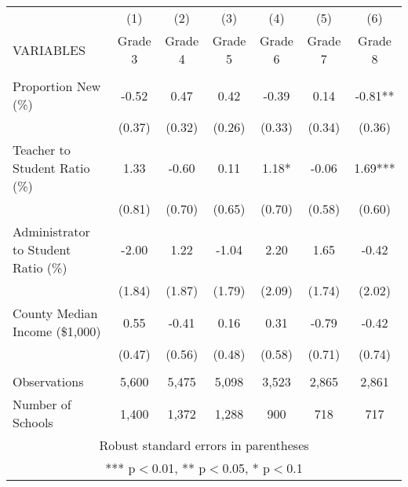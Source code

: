 \begin{tabular}{lcccccc}
\hline\hline
 & (1) & (2) & (3) & (4) & (5) & (6) \\
VARIABLES & Grade 3 & Grade 4 & Grade 5 & Grade 6 & Grade 7 & Grade 8 \\ \hline
 &  &  &  &  &  &  \\
Proportion New (\%) & -0.52 & 0.47 & 0.42 & -0.39 & 0.14 & -0.81** \\
 & (0.37) & (0.32) & (0.26) & (0.33) & (0.34) & (0.36) \\
Teacher to Student Ratio (\%) & 1.33 & -0.60 & 0.11 & 1.18* & -0.06 & 1.69*** \\
 & (0.81) & (0.70) & (0.65) & (0.70) & (0.58) & (0.60) \\
Administrator to Student Ratio (\%) & -2.00 & 1.22 & -1.04 & 2.20 & 1.65 & -0.42 \\
 & (1.84) & (1.87) & (1.79) & (2.09) & (1.74) & (2.02) \\
County Median Income (\$1,000) & 0.55 & -0.41 & 0.16 & 0.31 & -0.79 & -0.42 \\
 & (0.47) & (0.56) & (0.48) & (0.58) & (0.71) & (0.74) \\
 &  &  &  &  &  &  \\
Observations & 5,600 & 5,475 & 5,098 & 3,523 & 2,865 & 2,861 \\
Number of Schools & 1,400 & 1,372 & 1,288 & 900 & 718 & 717 \\ \hline\hline
\multicolumn{7}{c}{ Robust standard errors in parentheses} \\
\multicolumn{7}{c}{ *** p$<$0.01, ** p$<$0.05, * p$<$0.1} \\
\end{tabular}
